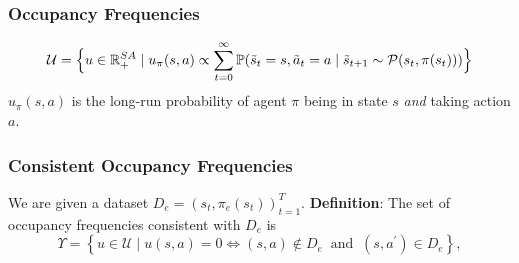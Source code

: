 \documentclass{beamer}
\begin{document}
\begin{frame} \frametitle{Occupancy Frequencies}
	\[
		\mathcal{U}
		=
		\Bigl\{ u\in \mathbb{R}^{SA}_{+} \mid u_\pi(s,a) \propto \sum_{t=0}^{\infty} \mathbb{P}(\tilde{s}_t = s, \tilde{a}_t = a \mid \tilde{s}_{t+1} \sim \mathcal{P}(s_t, \pi(s_t))) \Bigr\}
	\]
	\vfill
	$u_\pi(s,a)$ is the long-run probability of agent $\pi$ being in state $s$ \emph{and} taking action $a$.
\end{frame}

\begin{frame} \frametitle{Consistent Occupancy Frequencies}
	We are given a dataset $D_e = {(s_t, \pi_e(s_t))}_{t=1}^T$.
	\vfill
	\textbf{Definition}: The set of occupancy frequencies consistent with $D_e$ is
	\[
		\Upsilon = \left\{ u \in \mathcal{U} \mid u(s,a) = 0 \iff (s,a) \notin D_e \;\; \text{and} \;\; (s,a^\prime) \in D_e \right\},
	\]
\end{frame}


%
\end{document}
